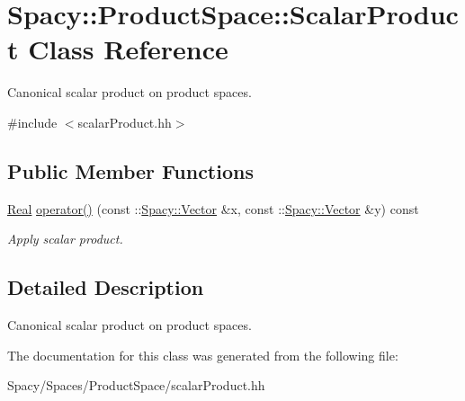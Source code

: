 \hypertarget{classSpacy_1_1ProductSpace_1_1ScalarProduct}{}\section{Spacy\+:\+:Product\+Space\+:\+:Scalar\+Product Class Reference}
\label{classSpacy_1_1ProductSpace_1_1ScalarProduct}


Canonical scalar product on product spaces.  




{\ttfamily \#include $<$scalar\+Product.\+hh$>$}

\subsection*{Public Member Functions}
\begin{DoxyCompactItemize}
\item 
\hypertarget{classSpacy_1_1ProductSpace_1_1ScalarProduct_a71a7e705455d1005c7611a259346c0c2}{}\hyperlink{classSpacy_1_1Real}{Real} \hyperlink{classSpacy_1_1ProductSpace_1_1ScalarProduct_a71a7e705455d1005c7611a259346c0c2}{operator()} (const \+::\hyperlink{classSpacy_1_1Vector}{Spacy\+::\+Vector} \&x, const \+::\hyperlink{classSpacy_1_1Vector}{Spacy\+::\+Vector} \&y) const \label{classSpacy_1_1ProductSpace_1_1ScalarProduct_a71a7e705455d1005c7611a259346c0c2}

\begin{DoxyCompactList}\small\item\em Apply scalar product. \end{DoxyCompactList}\end{DoxyCompactItemize}


\subsection{Detailed Description}
Canonical scalar product on product spaces. 

The documentation for this class was generated from the following file\+:\begin{DoxyCompactItemize}
\item 
Spacy/\+Spaces/\+Product\+Space/scalar\+Product.\+hh\end{DoxyCompactItemize}

